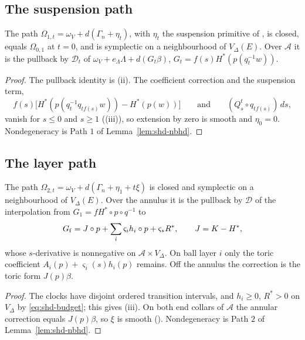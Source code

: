 \subsection{The suspension path}\label{sec:shd-second}
\begin{proposition}\label{prop:shd-second-path}
The path $\Omega_{1,t}=\omega_V+d(\Gamma_n+\eta_t)$, with $\eta_t$ the suspension primitive of ,
is closed, equals $\Omega_{0,1}$ at $t=0$, and is symplectic on a neighbourhood of $V_\Delta(E)$. Over $\mathcal A$ it is the
pullback by $\mathcal D_t$ of $\omega_V+e_\Lambda\Lambda+d(G_t\beta)$, $G_t=f(s)H^*(p(q_t^{-1}w))$.
\end{proposition}
\begin{proof}
The pullback identity is (ii). The coefficient correction and the suspension term,
\[
 f(s)\bigl[H^*(p(q_t^{-1}q_{tf(s)}w))-H^*(p(w))\bigr]\qquad\text{and}\qquad(Q^t_s\circ q_{tf(s)})\,ds,
\]
vanish for $s\le0$ and $s\ge1$ ((iii)), so extension by zero is smooth and $\eta_0=0$. Nondegeneracy is Path $1$ of
Lemma~\ref{lem:shd-nbhd}.
\end{proof}

\subsection{The layer path}\label{sec:shd-layer}
\begin{proposition}\label{prop:shd-layer-path}
The path $\Omega_{2,t}=\omega_V+d(\Gamma_n+\eta_1+t\xi)$ is closed and symplectic on a neighbourhood of $V_\Delta(E)$. Over the
annulus it is the pullback by $\mathcal D$ of the interpolation from $G_1=fH^*\circ p\circ q^{-1}$ to
\begin{equation}\label{eq:shd-Gf}
 G_{\rm f}=J\circ p+\sum_i\varsigma_i h_i\circ p+\varsigma_*R^*,\qquad J=K-H^*,
\end{equation}
whose $s$-derivative is nonnegative on $\mathcal A\times V_\Delta$. On ball layer $i$ only the toric coefficient
$A_i(p)+\varsigma_i(s)h_i(p)$ remains. Off the annulus the correction is the toric form $J(p)\beta$.
\end{proposition}
\begin{proof}
The clocks have disjoint ordered transition intervals, and $h_i\ge0$, $R^*>0$ on $V_\Delta$ by \eqref{eq:shd-budget}; this gives
(iii). On both end collars of $\mathcal A$ the annular correction equals $J(p)\beta$, so
$\xi$ is smooth (). Nondegeneracy is Path $2$ of Lemma~\ref{lem:shd-nbhd}.
\end{proof}

